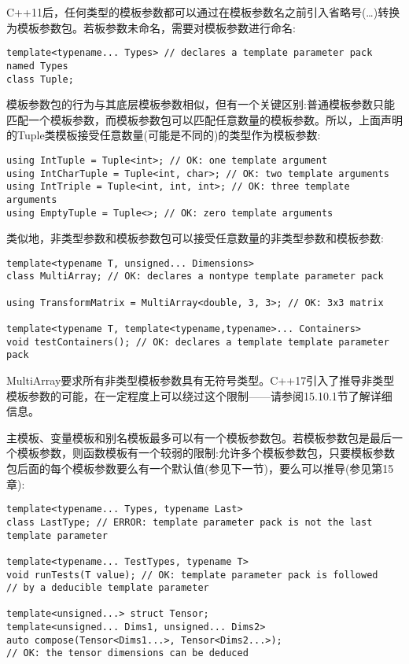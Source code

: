 C++11后，任何类型的模板参数都可以通过在模板参数名之前引入省略号(…)转换为模板参数包。若板参数未命名，需要对模板参数进行命名:

\begin{lstlisting}[style=styleCXX]
template<typename... Types> // declares a template parameter pack named Types
class Tuple;
\end{lstlisting}

模板参数包的行为与其底层模板参数相似，但有一个关键区别:普通模板参数只能匹配一个模板参数，而模板参数包可以匹配任意数量的模板参数。所以，上面声明的Tuple类模板接受任意数量(可能是不同的)的类型作为模板参数:

\begin{lstlisting}[style=styleCXX]
using IntTuple = Tuple<int>; // OK: one template argument
using IntCharTuple = Tuple<int, char>; // OK: two template arguments
using IntTriple = Tuple<int, int, int>; // OK: three template arguments
using EmptyTuple = Tuple<>; // OK: zero template arguments
\end{lstlisting}

类似地，非类型参数和模板参数包可以接受任意数量的非类型参数和模板参数:

\begin{lstlisting}[style=styleCXX]
template<typename T, unsigned... Dimensions>
class MultiArray; // OK: declares a nontype template parameter pack

using TransformMatrix = MultiArray<double, 3, 3>; // OK: 3x3 matrix

template<typename T, template<typename,typename>... Containers>
void testContainers(); // OK: declares a template template parameter pack
\end{lstlisting}

MultiArray要求所有非类型模板参数具有无符号类型。C++17引入了推导非类型模板参数的可能，在一定程度上可以绕过这个限制——请参阅15.10.1节了解详细信息。

主模板、变量模板和别名模板最多可以有一个模板参数包。若模板参数包是最后一个模板参数，则函数模板有一个较弱的限制:允许多个模板参数包，只要模板参数包后面的每个模板参数要么有一个默认值(参见下一节)，要么可以推导(参见第15章):

\begin{lstlisting}[style=styleCXX]
template<typename... Types, typename Last>
class LastType; // ERROR: template parameter pack is not the last template parameter

template<typename... TestTypes, typename T>
void runTests(T value); // OK: template parameter pack is followed
// by a deducible template parameter

template<unsigned...> struct Tensor;
template<unsigned... Dims1, unsigned... Dims2>
auto compose(Tensor<Dims1...>, Tensor<Dims2...>);
// OK: the tensor dimensions can be deduced
\end{lstlisting}


